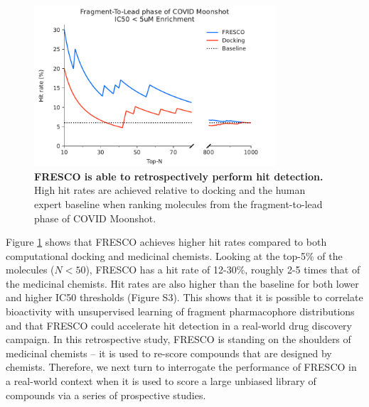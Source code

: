 \begin{figure}[th]
 \centering
 \includegraphics[width=0.8\textwidth]{Chapters/Fresco/Figs/fresco_vs_moonshot_break_5uM.pdf}
 \caption{\textbf{FRESCO is able to retrospectively perform hit detection.} High hit rates are achieved relative to docking and the human expert baseline when ranking molecules from the fragment-to-lead phase of COVID Moonshot.}
 \label{fig:moonshot_enrichment_vs_docking}
\end{figure}

Figure \ref{fig:moonshot_enrichment_vs_docking} shows that FRESCO achieves higher hit rates compared to both computational docking and medicinal chemists. Looking at the top-5\% of the molecules ($N<50$), FRESCO has a hit rate of 12-30\%, roughly 2-5 times that of the medicinal chemists. Hit rates are also higher than the baseline for both lower and higher IC50 thresholds (Figure S3). This shows that it is possible to correlate bioactivity with unsupervised learning of fragment pharmacophore distributions and that FRESCO could accelerate hit detection in a real-world drug discovery campaign. In this retrospective study, FRESCO is standing on the shoulders of medicinal chemists -- it is used to re-score compounds that are designed by chemists. Therefore, we next turn to interrogate the performance of FRESCO in a real-world context when it is used to score a large unbiased library of compounds via a series of prospective studies. 


